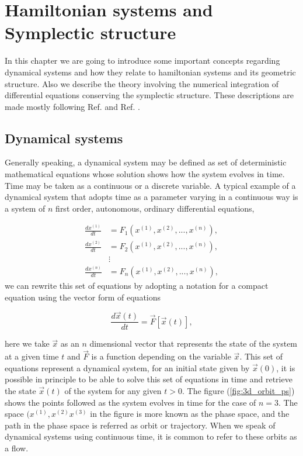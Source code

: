 \pagestyle{fancy}
\fancyhf{}
\rhead{\rightmark}
\lhead{\thepage}

\chapter{Hamiltonian systems and Symplectic structure}
In this chapter we are going to introduce some important concepts regarding dynamical systems and how they relate to hamiltonian systems and its geometric structure. Also we describe the theory involving the numerical integration of differential equations conserving the symplectic structure. These descriptions are made mostly following Ref. \cite{ott_chaos_2002} and Ref. \cite{sanz2018numerical}.





\section{Dynamical systems}
Generally speaking, a dynamical system may be defined as set of deterministic mathematical equations whose solution shows how the system evolves in time. Time may be taken as a continuous or a discrete variable. A typical example of a dynamical system that adopts time as a parameter varying in  a continuous way is a system of $n$ first order, autonomous, ordinary differential equations,

\begin{eqnarray} 
\frac{dx^{(1)}}{dt}&=F_1(x^{(1)},x^{(2)},...,x^{(n)}),\nonumber \\
\frac{dx^{(2)}}{dt}&=F_2(x^{(1)},x^{(2)},...,x^{(n)}),\\
&\vdots \nonumber \\
\frac{dx^{(n)}}{dt}&=F_n(x^{(1)},x^{(2)},...,x^{(n)}),
\nonumber
\label{eq:set_diff_eqs}
\end{eqnarray} 
we can rewrite this set of equations by adopting a notation for a compact equation using the vector form of equations

\begin{equation}
\frac{d\vec{x}(t)}{dt}=\vec{F}[\vec{x}(t)],
\label{eq_:vect_diff_eqs}
\end{equation}

here we take $\vec{x}$ as an $n$ dimensional vector that represents the state of the system at a given time $t$ and $\vec{F}$ is a function depending on the variable $\vec{x}$. This set of equations represent a dynamical system, for an initial state given by $\vec{x}(0)$, it is possible in principle to be able to solve this set of equations in time and retrieve the state $\vec{x}(t)$ of the system for any given $t>0$. The figure (\ref{fig:3d_orbit_ps}) shows the points followed as the system evolves in time for the case of $n=3$. The space $(x^{(1)},x^{(2)}x^{(3)}$ in the figure is more known as the phase space, and the path in the phase space is referred as orbit or trajectory. When we speak of dynamical systems using continuous time, it is common to refer to these orbits as a flow.

